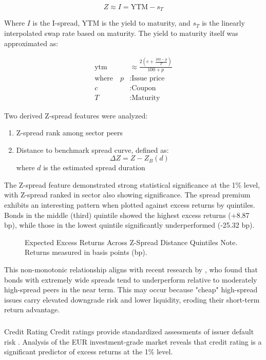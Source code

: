 $$Z \approx I = \text{YTM} - s_T$$

Where $I$ is the I-spread, YTM is the yield to maturity, and $s_T$ is the linearly interpolated swap rate based on maturity. The yield to maturity itself was approximated as:

\begin{align}
\text{ytm} &\approx \frac{2(c+ \frac{100-p}{T})}{100+p} \\
\text{where} \quad p &: \text{Issue price} \nonumber\\
c &: \text{Coupon} \nonumber\\
T &: \text{Maturity} \nonumber
\end{align}

Two derived Z-spread features were analyzed:

\begin{enumerate}
    \item Z-spread rank among sector peers
    \item Distance to benchmark spread curve, defined as:
    $$\Delta Z = Z - Z_B(d)$$
    where $d$ is the estimated spread duration
\end{enumerate}

The Z-spread feature demonstrated strong statistical significance at the 1\% level, with Z-spread ranked in sector also showing significance. The spread premium exhibits an interesting pattern when plotted against excess returns by quintiles. Bonds in the middle (third) quintile showed the highest excess returns (+8.87 bp), while those in the lowest quintile significantly underperformed (-25.32 bp).

\begin{figure}[h]
    \begin{center}
        
    \end{center}
    \caption{Expected Excess Returns Across Z-Spread Distance Quintiles Note. Returns measured in basis points (bp).}
    \label{fig:z_premium}
\end{figure}

This non-monotonic relationship aligns with recent research by \textcite{Dickerson2024FactorDelays}, who found that bonds with extremely wide spreads tend to underperform relative to moderately high-spread peers in the near term. This may occur because "cheap" high-spread issues carry elevated downgrade risk and lower liquidity, eroding their short-term return advantage.

\subsubsection{}{Credit Rating}
Credit ratings provide standardized assessments of issuer default risk \parencite[pp. 26 - 28]{Fabozzi2021TheEdition}. Analysis of the EUR investment-grade market reveals that credit rating is a significant predictor of excess returns at the 1\% level.

